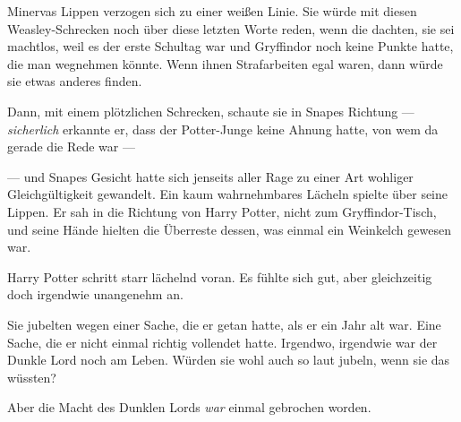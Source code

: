 Minervas Lippen verzogen sich zu einer weißen Linie. Sie würde mit diesen Weasley-Schrecken noch über diese letzten Worte reden, wenn die dachten, sie sei machtlos, weil es der erste Schultag war und Gryffindor noch keine Punkte hatte, die man wegnehmen könnte. Wenn ihnen Strafarbeiten egal waren, dann würde sie etwas anderes finden.

Dann, mit einem plötzlichen Schrecken, schaute sie in Snapes Richtung — \emph{sicherlich} erkannte er, dass der Potter-Junge keine Ahnung hatte, von wem da gerade die Rede war —

— und Snapes Gesicht hatte sich jenseits aller Rage zu einer Art wohliger Gleichgültigkeit gewandelt. Ein kaum wahrnehmbares Lächeln spielte über seine Lippen. Er sah in die Richtung von Harry Potter, nicht zum Gryffindor-Tisch, und seine Hände hielten die Überreste dessen, was einmal ein Weinkelch gewesen war.

\later

Harry Potter schritt starr lächelnd voran. Es fühlte sich gut, aber gleichzeitig doch irgendwie unangenehm an.

Sie jubelten wegen einer Sache, die er getan hatte, als er ein Jahr alt war. Eine Sache, die er nicht einmal richtig vollendet hatte. Irgendwo, irgendwie war der Dunkle Lord noch am Leben. Würden sie wohl auch so laut jubeln, wenn sie das wüssten?

Aber die Macht des Dunklen Lords \emph{war} einmal gebrochen worden.

